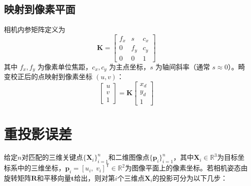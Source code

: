\subsection{映射到像素平面}
相机内参矩阵定义为
\begin{equation}
	\mathbf{K} =
	\begin{bmatrix}
		f_x & s   & c_x\\
		0   & f_y & c_y\\
		0   & 0   & 1
	\end{bmatrix}
\end{equation}
其中 $f_x,f_y$ 为像素单位焦距，$c_x,c_y$ 为主点坐标，$s$ 为轴间斜率（通常 $s\approx0$）。畸变校正后的点映射到像素坐标 $(u,v)$：
\begin{equation}
	\begin{bmatrix}
		u\\v\\1
	\end{bmatrix}
	=
	\mathbf{K}
	\begin{bmatrix}
		x_{d}\\y_{d}\\1
	\end{bmatrix}
	\label{eq:pixel_projection}
\end{equation}




\section{重投影误差}
给定$n$对匹配的三维关键点$\{\mathbf{X}_i\}_{i=1}^n$和二维图像点$\{\mathbf{p}_i\}_{i=1}^n$，其中$\mathbf{X}_i \in \mathbb{R}^3$为目标坐标系中的三维坐标，$\mathbf{p}_i = [u_i,\;v_i]^\mathsf{T}\in\mathbb{R}^2$为图像平面上的像素坐标。若相机姿态由旋转矩阵$\mathbf{R}$和平移向量$\mathbf{t}$给出，则对第$i$个三维点$\mathbf{X}_i$的投影可分为以下几步：

